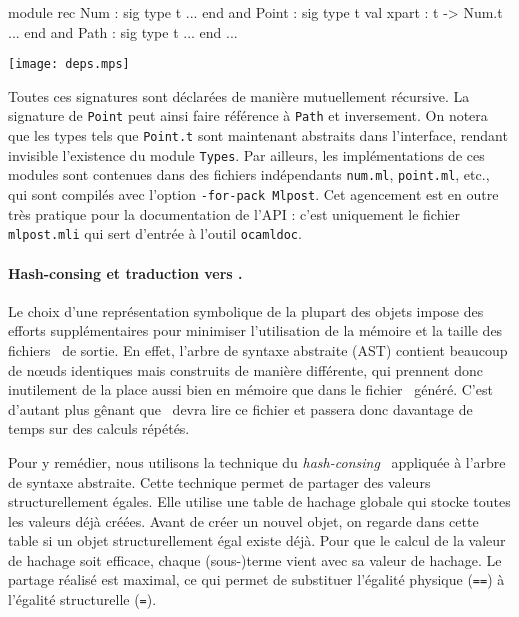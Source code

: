 \documentclass[twoside]{studia-Hermann}
\newcommand{\metapost}{\MP}
\begin{document}
\medskip
\begin{minipage}{0.33\textwidth}
\begin{ocaml}
module rec Num : sig
  type t
  ...
end
and Point : sig
  type t
  val xpart : t -> Num.t
  ...
end
and Path : sig
  type t
  ...
end
...
\end{ocaml}
\end{minipage}
\begin{minipage}{0.65\textwidth}
  \texttt{[image: deps.mps]}
\end{minipage}

Toutes ces signatures sont déclarées de manière mutuellement
récursive. La signature de \texttt{Point} peut ainsi faire référence à
\texttt{Path} et inversement.  On notera que les types tels que
\texttt{Point.t} sont maintenant abstraits dans l'interface, rendant
invisible l'existence du module \texttt{Types}.  Par ailleurs, les
implémentations de ces modules sont contenues dans des fichiers
indépendants \texttt{num.ml}, \texttt{point.ml}, etc., qui sont
compilés avec l'option {\tt -for-pack Mlpost}.  Cet agencement est en
outre très pratique pour la documentation de l'API : c'est uniquement
le fichier \texttt{mlpost.mli} qui sert d'entrée à l'outil
\texttt{ocamldoc}.

\paragraph{Hash-consing et traduction vers \metapost.}

Le choix d'une représentation symbolique de la plupart des objets impose
des efforts supplémentaires pour minimiser l'utilisation de la mémoire
et la taille des fichiers \metapost\ de sortie. En effet, l'arbre de
syntaxe abstraite (AST) contient beaucoup de n\oe uds identiques mais
construits de manière différente, qui prennent donc inutilement de la
place aussi bien en mémoire que dans le fichier \metapost\ généré. C'est
d'autant plus gênant que \metapost\ devra lire ce fichier et passera
donc davantage de temps sur des calculs répétés.

Pour y remédier, nous utilisons la technique du {\em
hash-consing}~\cite{ConchonFilliatre06wml} appliquée à l'arbre de syntaxe
abstraite. Cette technique permet de partager des valeurs structurellement
égales. Elle utilise une table de hachage globale qui stocke toutes les valeurs
déjà créées. Avant de créer un nouvel objet, on regarde dans cette table si un
objet structurellement égal existe déjà. Pour que le calcul de la valeur de
hachage soit efficace, chaque (sous-)terme
vient avec sa valeur de hachage. Le partage réalisé est maximal, ce
qui permet de substituer l'égalité physique (\texttt{==}) à l'égalité
structurelle (\texttt{=}). 
\end{document}
